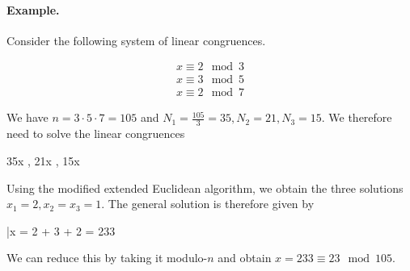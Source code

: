\paragraph{Example.} Consider the following system of linear congruences.

\begin{align*}
    x \equiv 2 \mod 3 \\
    x \equiv 3 \mod 5 \\
    x \equiv 2 \mod 7
\end{align*}

We have $n = 3 \cdot 5 \cdot 7 = 105$ and $N_1 = \frac{105}{3} = 35, N_2 = 21, N_3 = 15$. We therefore need to solve the linear congruences

\bee
35x  , \quad 21x  , \quad 15x  
\eee

Using the modified extended Euclidean algorithm, we obtain the three solutions $x_1 = 2, x_2 = x_3 = 1$. The general solution is therefore given by 

\bee
\bar{x} = 2   + 3   + 2   = 233
\eee

We can reduce this by taking it modulo-$n$ and obtain $x = 233 \equiv 23 \mod 105$.

